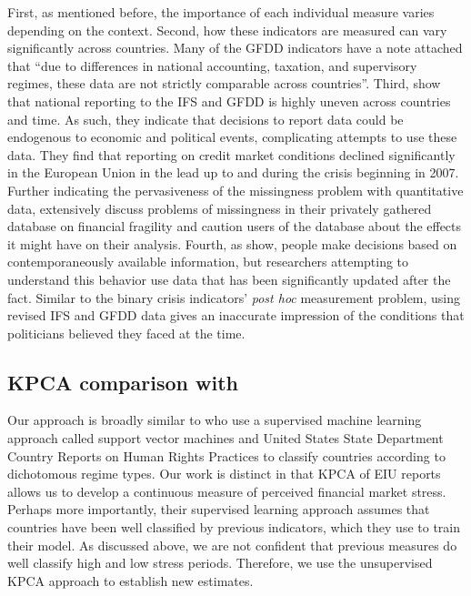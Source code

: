 \documentclass[]{article}
\begin{document}
First, as mentioned before, the importance of each individual measure varies depending on the context. Second, how these indicators are measured can vary significantly across countries. Many of the GFDD indicators have a note attached that ``due to differences in national accounting, taxation, and supervisory regimes, these data are not strictly comparable across countries''. Third, \cite{cghBruegel2015} show that national reporting to the IFS and GFDD is highly uneven across countries and time. As such, they indicate that decisions to report data could be endogenous to economic and political events, complicating attempts to use these data. They find that reporting on credit market conditions declined significantly in the European Union in the lead up to and during the crisis beginning in 2007. Further indicating the pervasiveness of the missingness problem with quantitative data, \cite{Andrianova2015} extensively discuss problems of missingness in their privately gathered database on financial fragility and caution users of the database about the effects it might have on their analysis. Fourth, as \cite{KayserLeininger2015} show, people make decisions based on contemporaneously available information, but researchers attempting to understand this behavior use data that has been significantly updated after the fact. Similar to the binary crisis indicators' \textit{post hoc} measurement problem, using revised IFS and GFDD data gives an inaccurate impression of the conditions that politicians believed they faced at the time.

\subsection*{KPCA comparison with \cite{Minhas2015}}

Our approach is broadly similar to \cite{Minhas2015} who use a supervised machine learning approach called support vector machines and United States State Department Country Reports on Human Rights Practices to classify countries according to dichotomous regime types. Our work is distinct in that KPCA of EIU reports allows us to develop a continuous measure of perceived financial market stress. Perhaps more importantly, their supervised learning approach assumes that countries have been well classified by previous indicators, which they use to train their model. As discussed above, we are not confident that previous measures do well classify high and low stress periods. Therefore, we use the unsupervised KPCA approach to establish new estimates.
\end{document}
